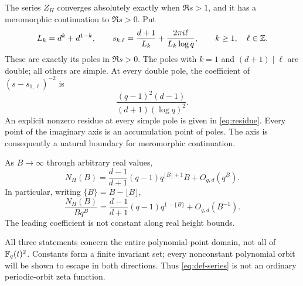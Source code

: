 \begin{theorem}\label{thm:poles}
The series $Z_H$ converges absolutely exactly when $\Re s>1$,
and it has a meromorphic continuation to $\Re s>0$. Put
\begin{equation}\label{eq:pole-lattice}
 L_k=d^k+d^{1-k},\qquad
 s_{k,\ell}=\frac{d+1}{L_k}+
 \frac{2\pi i\ell}{L_k\log q},\qquad k\ge1,\quad\ell\in\mathbb Z.
\end{equation}
These are exactly its poles in $\Re s>0$. The poles with $k=1$
and $(d+1)\mid\ell$ are double; all others are simple.
At every double pole, the coefficient of $(s-s_{1,\ell})^{-2}$ is
\begin{equation}\label{eq:double-coeff}
 \frac{(q-1)^2(d-1)}{(d+1)(\log q)^2}.
\end{equation}
An explicit nonzero residue at every simple pole is given in
\eqref{eq:residue}. Every point of the imaginary axis is an
accumulation point of poles. The axis is consequently a natural
boundary for meromorphic continuation.
\end{theorem}

\begin{theorem}\label{thm:counting}
As $B\to\infty$ through arbitrary real values,
\begin{equation}\label{eq:asymptotic}
 N_H(B)=\frac{d-1}{d+1}(q-1)q^{\lfloor B\rfloor+1}B
       +O_{q,d}(q^B).
\end{equation}
In particular, writing $\{B\}=B-\lfloor B\rfloor$,
\[
 \frac{N_H(B)}{Bq^B}
 =\frac{d-1}{d+1}(q-1)q^{1-\{B\}}+O_{q,d}(B^{-1}).
\]
The leading coefficient is not constant along real height bounds.
\end{theorem}

All three statements concern the entire polynomial-point domain, not
all of $\mathbb F_q(t)^2$. Constants form a finite invariant set; every
nonconstant polynomial orbit will be shown to escape in both
directions. Thus \eqref{eq:def-series} is not an ordinary
periodic-orbit zeta function.
